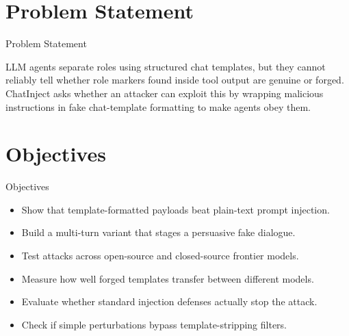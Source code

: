 \documentclass[10pt]{beamer}
\begin{document}
\section{Problem Statement}
\begin{frame}{Problem Statement}
  \begin{block}{}
  LLM agents separate roles using structured chat templates, but they cannot reliably tell whether role markers found inside tool output are genuine or forged. ChatInject asks whether an attacker can exploit this by wrapping malicious instructions in fake chat-template formatting to make agents obey them.
  \end{block}
\end{frame}
\section{Objectives}
\begin{frame}{Objectives}
\begin{itemize}
  \item Show that template-formatted payloads beat plain-text prompt injection.
  \item Build a multi-turn variant that stages a persuasive fake dialogue.
  \item Test attacks across open-source and closed-source frontier models.
  \item Measure how well forged templates transfer between different models.
  \item Evaluate whether standard injection defenses actually stop the attack.
  \item Check if simple perturbations bypass template-stripping filters.
\end{itemize}
\end{frame}
\end{document}
